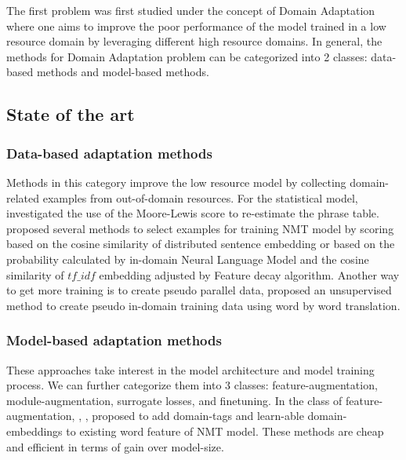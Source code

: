 \documentclass[12pt,a4paper,twoside]{report}
\theoremstyle{definition}
\begin{document}
The first problem was first studied under the concept of Domain Adaptation where one aims to improve the poor performance of the model trained in a low resource domain by leveraging different high resource domains. In general, the methods for Domain Adaptation problem can be categorized into 2 classes: data-based methods and model-based methods.

\subsection*{State of the art}

\subsubsection*{Data-based adaptation methods}
Methods in this category improve the low resource model by collecting domain-related examples from out-of-domain resources. For the statistical model, \cite{mansour12simple} investigated the use of the Moore-Lewis score to re-estimate the phrase table.\cite{Duh13selection,Axelrod11domain,silva2018extracting} proposed several methods to select examples for training NMT model by scoring based on the cosine similarity of distributed sentence embedding or based on the probability calculated by in-domain Neural Language Model and the cosine similarity of $tf\_idf$ embedding adjusted by Feature decay algorithm. Another way to get more training is to create pseudo parallel data, \cite{Junjie19domain} proposed an unsupervised method to create pseudo in-domain training data using word by word translation.

\subsubsection*{Model-based adaptation methods}
These approaches take interest in the model architecture and model training process. We can further categorize them into 3 classes: feature-augmentation, module-augmentation, surrogate losses, and finetuning. In the class of feature-augmentation, \cite{Kobus17domain}, \cite{kenji17multi}, \cite{Pham19generic} proposed to add domain-tags and learn-able domain-embeddings to existing word feature of NMT model. These methods are cheap and efficient in terms of gain over model-size.
\end{document}
